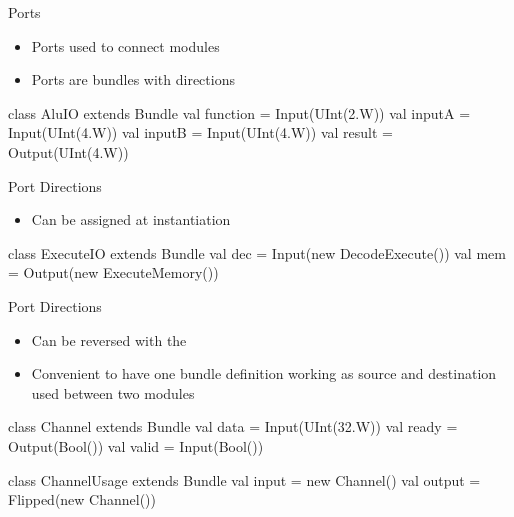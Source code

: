 \begin{frame}[fragile]{Ports}
\begin{itemize}
\item Ports used to connect modules
\item Ports are bundles with directions
\end{itemize}
\begin{chisel}
class AluIO extends Bundle {
  val function = Input(UInt(2.W))
  val inputA = Input(UInt(4.W))
  val inputB = Input(UInt(4.W))
  val result = Output(UInt(4.W))
}
\end{chisel}
\end{frame}

\begin{frame}[fragile]{Port Directions}
\begin{itemize}
\item Can be assigned at instantiation
\end{itemize}
\begin{chisel}
class ExecuteIO extends Bundle {
  val dec = Input(new DecodeExecute())
  val mem = Output(new ExecuteMemory())
}
\end{chisel}
\begin{chisel}
\end{chisel}
\end{frame}

\begin{frame}[fragile]{Port Directions}
\begin{itemize}
\item Can be reversed with the 
\item Convenient to have one bundle definition working as source
and destination used between two modules
\end{itemize}
\begin{chisel}
class Channel extends Bundle {
  val data = Input(UInt(32.W))
  val ready = Output(Bool())
  val valid = Input(Bool())
}

class ChannelUsage extends Bundle {
  val input = new Channel()
  val output = Flipped(new Channel())
}
\end{chisel}
\end{frame}

